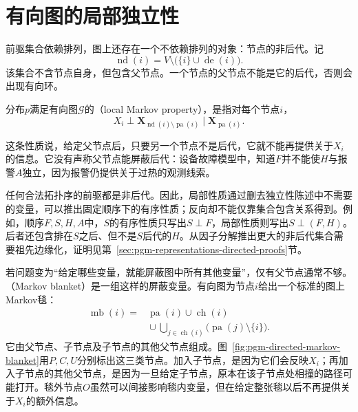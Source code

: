\section{有向图的局部独立性}
\label{sec:pgm-directed-local}

前驱集合依赖排列，图上还存在一个不依赖排列的对象：节点的非后代。记
\[
  \operatorname{nd}(i)=V\setminus\bigl(\{i\}\cup\operatorname{de}(i)\bigr).
\]
该集合不含节点自身，但包含父节点。一个节点的父节点不能是它的后代，否则会出现有向环。

\begin{definition}[局部Markov性质]
  \label{def:pgm-directed-local-markov}
  分布$p$满足有向图$\mathcal{G}$的（local Markov property），是指对每个节点$i$，
  \begin{equation}
    X_i\perp
    \bm{X}_{\operatorname{nd}(i)\setminus\operatorname{pa}(i)}
    \mid\bm{X}_{\operatorname{pa}(i)}.
    \label{eq:pgm-directed-local-markov}
  \end{equation}
\end{definition}

这条性质说，给定父节点后，只要另一个节点不是后代，它就不能再提供关于$X_i$的信息。它没有声称父节点能屏蔽后代：设备故障模型中，知道$F$并不能使$H$与报警$A$独立，因为报警仍提供关于过热的观测线索。

任何合法拓扑序的前驱都是非后代。因此，局部性质通过删去独立性陈述中不需要的变量，可以推出固定顺序下的有序性质；反向却不能仅靠集合包含关系得到。例如，顺序$F,S,H,A$中，$S$的有序性质只写出$S\perp F$，局部性质则写出$S\perp(F,H)$。后者还包含排在$S$之后、但不是$S$后代的$H$。从因子分解推出更大的非后代集合需要祖先边缘化，证明见第~\ref{sec:pgm-representations-directed-proofs}节。

若问题变为“给定哪些变量，就能屏蔽图中所有其他变量”，仅有父节点通常不够。（Markov blanket）是一组这样的屏蔽变量。有向图为节点$i$给出一个标准的图上Markov毯：
\begin{equation}
  \begin{aligned}
    \operatorname{mb}(i)
    ={}&\operatorname{pa}(i)\cup\operatorname{ch}(i)\\
       &{}\cup\bigcup_{j\in\operatorname{ch}(i)}
           \bigl(\operatorname{pa}(j)\setminus\{i\}\bigr).
  \end{aligned}
  \label{eq:pgm-directed-blanket}
\end{equation}
它由父节点、子节点及子节点的其他父节点组成。图~\ref{fig:pgm-directed-markov-blanket}用$P,C,U$分别标出这三类节点。加入子节点，是因为它们会反映$X_i$；再加入子节点的其他父节点，是因为一旦给定子节点，原本在该子节点处相撞的路径可能打开。毯外节点$O$虽然可以间接影响毯内变量，但在给定整张毯以后不再提供关于$X_i$的额外信息。

